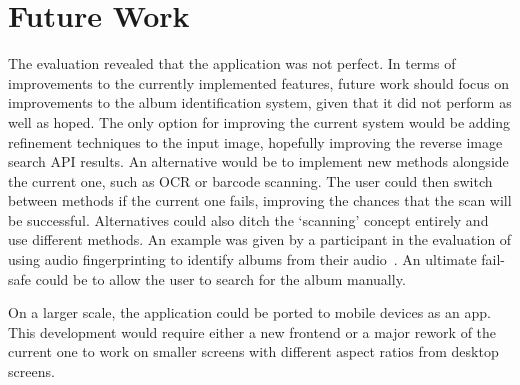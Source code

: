 \section{Future Work}
The evaluation revealed that the application was not perfect. In terms of improvements to the currently implemented features, future work should focus on improvements to the album identification system, given that it did not perform as well as hoped. The only option for improving the current system would be adding refinement techniques to the input image, hopefully improving the reverse image search API results. An alternative would be to implement new methods alongside the current one, such as OCR or barcode scanning. The user could then switch between methods if the current one fails, improving the chances that the scan will be successful.
Alternatives could also ditch the `scanning' concept entirely and use different methods. An example was given by a participant in the evaluation of using audio fingerprinting to identify albums from their audio~\cite{Cano2005}. An ultimate fail-safe could be to allow the user to search for the album manually.

On a larger scale, the application could be ported to mobile devices as an app. This development would require either a new frontend or a major rework of the current one to work on smaller screens with different aspect ratios from desktop screens.
